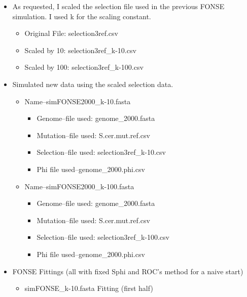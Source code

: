 \documentclass[11pt]{labbook}
\begin{document}
    \begin{itemize}
        \item As requested, I scaled the selection file used in the previous FONSE simulation.
        I used k for the scaling constant.
            \begin{itemize}
                \item Original File: selection3ref.csv
                \item Scaled by 10: selection3ref\_k-10.csv
                \item Scaled by 100: selection3ref\_k-100.csv
            \end{itemize}
        \item Simulated new data using the scaled selection data.
            \begin{itemize}
                \item Name--simFONSE2000\_k-10.fasta
                    \begin{itemize}
                        \item Genome--file used: genome\_2000.fasta
                        \item Mutation--file used: S.cer.mut.ref.csv
                        \item Selection--file used: selection3ref\_k-10.csv
                        \item Phi file used--genome\_2000.phi.csv
                    \end{itemize}
                \item Name--simFONSE2000\_k-100.fasta
                    \begin{itemize}
                        \item Genome--file used: genome\_2000.fasta
                        \item Mutation--file used: S.cer.mut.ref.csv
                        \item Selection--file used: selection3ref\_k-100.csv
                        \item Phi file used--genome\_2000.phi.csv
                    \end{itemize}
            \end{itemize}
        \item FONSE Fittings (all with fixed Sphi and ROC's method for a naive start)
            \begin{itemize}        
                \item simFONSE\_k-10.fasta Fitting (first half) 

\end{itemize}
\end{itemize}
\end{document}
